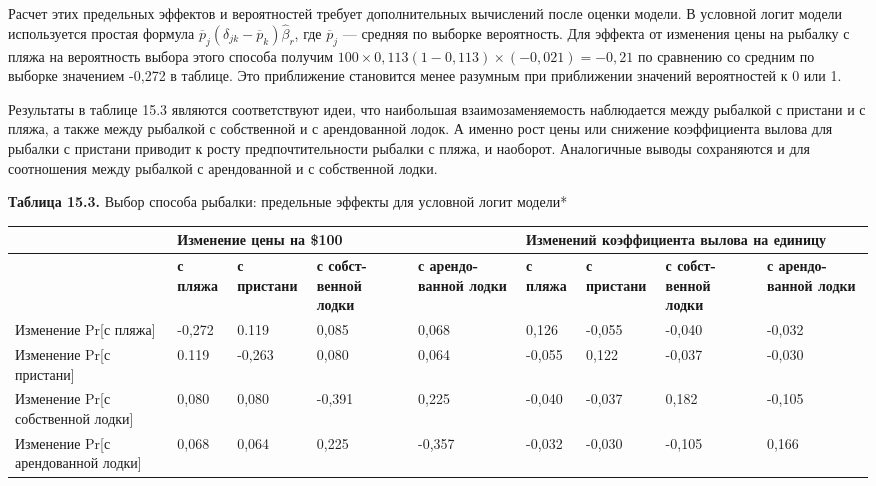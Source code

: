 Расчет этих предельных эффектов и вероятностей требует дополнительных вычислений после оценки модели. В  условной логит модели используется простая формула ${\overline{p}}_j\left({\delta }_{jk}-{\overline{p}}_k\right){\widehat{\beta }}_r$, где ${\overline{p}}_j$ --- средняя по выборке вероятность. Для эффекта от изменения цены на рыбалку с пляжа на вероятность выбора этого способа получим $100\times 0,113\left(1-0,113\right)\times \left(-0,021\right)=-0,21$ по сравнению со средним по выборке значением -0,272 в таблице. Это приближение становится менее разумным при приближении значений вероятностей к 0 или 1.

Результаты в таблице 15.3 являются соответствуют идеи, что наибольшая взаимозаменяемость наблюдается между рыбалкой с пристани и с пляжа, а также между рыбалкой с собственной и с арендованной лодок. А именно рост цены или снижение коэффициента вылова для рыбалки с пристани приводит к росту предпочтительности рыбалки с пляжа, и наоборот. Аналогичные выводы сохраняются и для соотношения между рыбалкой с арендованной и с собственной лодки.

\textbf{Таблица 15.3. }Выбор способа рыбалки: предельные эффекты для условной логит модели*

\begin{tabular}{|p{0.7in}|p{0.4in}|p{0.5in}|p{0.5in}|p{0.6in}|p{0.4in}|p{0.5in}|p{0.5in}|p{0.6in}|} \hline 
 & \multicolumn{4}{|p{2.0in}|}{\textbf{Изменение цены на \$100}} & \multicolumn{4}{|p{2.0in}|}{\textbf{Изменений коэффициента вылова на единицу}} \\ \hline 
 & \textbf{с пляжа} & \textbf{с пристани} & \textbf{с собст-венной лодки} & \textbf{с арендо-\newline ванной лодки} & \textbf{с пляжа} & \textbf{с пристани} & \textbf{с собст-венной лодки} & \textbf{с арендо-ванной лодки} \\ \hline 
Изменение Pr[с пляжа] & -0,272 & 0.119 & 0,085 & 0,068 & 0,126 & -0,055 & -0,040 & -0,032 \\ \hline 
Изменение Pr[с пристани] & 0.119 & -0,263 & 0,080 & 0,064 & -0,055 & 0,122 & -0,037 & -0,030 \\ \hline 
Изменение Pr[с собственной лодки] & 0,080 & 0,080 & -0,391 & 0,225 & -0,040 & -0,037 & 0,182 & -0,105 \\ \hline 
Изменение Pr[с арендованной лодки] & 0,068 & 0,064 & 0,225 & -0,357 & -0,032 & -0,030 & -0,105 & 0,166 \\ \hline 
\end{tabular}

